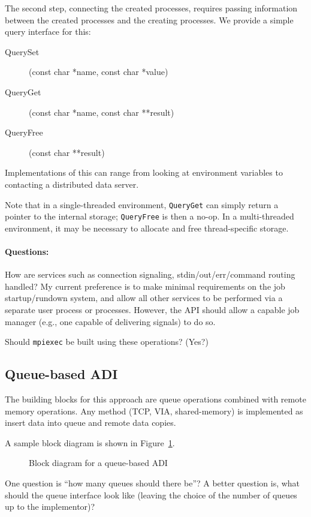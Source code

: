 \documentclass{article}
\let\code=\texttt
\def\questions{\ifvmode\else\par\fi\paragraph*{Questions:}}
\begin{document}
The second step, connecting the created processes, requires passing
information between the created processes and the creating processes.  We
provide a simple query interface for this:
\begin{description}
\item[QuerySet](const char *name, const char *value)\\
\item[QueryGet](const char *name, const char **result)\\
\item[QueryFree](const char **result)\\
\end{description}

Implementations of this can range from looking at environment variables to
contacting a distributed data server.

Note that in a single-threaded environment, \code{QueryGet} can simply return
a pointer to the internal storage; \code{QueryFree} is then a no-op.  In a
multi-threaded environment, it may be necessary to allocate and free
thread-specific storage.

\questions
How are services such as connection signaling, stdin/out/err/command routing
handled?   My current preference is to make minimal requirements on the job
startup/rundown system, and allow all other services to be performed via a
separate user process or processes.  However, the API should allow a capable
job manager (e.g., one capable of delivering signals) to do so.

Should \code{mpiexec} be built using these operations? (Yes?)

\subsection{Queue-based ADI}
The building blocks for this approach are queue operations combined with
remote memory operations.  Any method (TCP, VIA, shared-memory) is implemented
as insert data into queue and remote data copies.

A sample block diagram is shown in Figure~\ref{fig:block-diag}.

\begin{figure}
\centerline{}
\caption{Block diagram for a queue-based ADI}\label{fig:block-diag}
\end{figure}

One question is ``how many queues should there be''?  A better question is,
what should the queue interface look like (leaving the choice of the number of
queues up to the implementor)?
\end{document}
